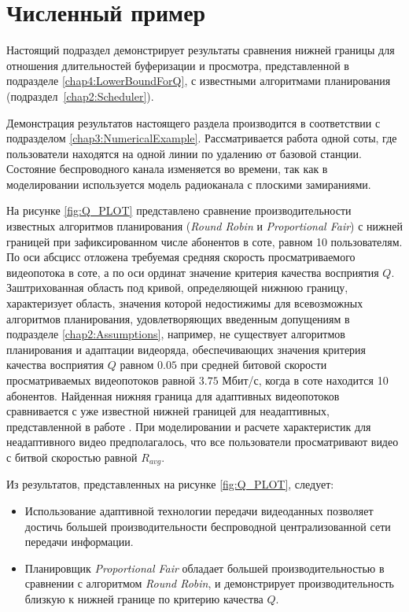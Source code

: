 \section{Численный пример}
\label{chap4:NumericalExample}

Настоящий подраздел демонстрирует результаты сравнения нижней границы для отношения длительностей буферизации и просмотра, представленной в подразделе \ref{chap4:LowerBoundForQ}, с известными алгоритмами планирования (подраздел~\ref{chap2:Scheduler}).

Демонстрация результатов настоящего раздела производится в соответствии с подразделом \ref{chap3:NumericalExample}. Рассматривается работа одной соты, где пользователи находятся на одной линии по удалению от базовой станции. Состояние беспроводного канала изменяется во времени, так как в моделировании используется модель радиоканала с плоскими замираниями.

На рисунке \ref{fig:Q_PLOT} представлено сравнение производительности известных алгоритмов планирования (\textit{Round Robin} и \textit{Proportional Fair}) с нижней границей при зафиксированном числе абонентов в соте, равном 10 пользователям. По оси абсцисс отложена требуемая средняя скорость просматриваемого видеопотока в соте, а по оси ординат значение критерия качества восприятия $Q$. Заштрихованная область под кривой, определяющей нижнюю границу, характеризует область, значения которой недостижимы для всевозможных алгоритмов планирования, удовлетворяющих введенным допущениям в подразделе \ref{chap2:Assumptions}, например, не существует алгоритмов планирования и адаптации видеоряда, обеспечивающих значения критерия качества восприятия $Q$ равном $0.05$ при средней битовой скорости просматриваемых видеопотоков равной $3.75$ Мбит/с, когда в соте находится 10 абонентов. Найденная нижняя граница для адаптивных видеопотоков сравнивается с уже известной нижней границей для неадаптивных, представленной в работе \cite{Bakin_Globecom}. При моделировании и расчете характеристик для неадаптивного видео предполагалось, что все пользователи просматривают видео с битвой скоростью равной $R_{avg}$.


Из результатов, представленных на рисунке \ref{fig:Q_PLOT}, следует:
\begin{itemize}
	\item Использование адаптивной технологии передачи видеоданных позволяет достичь большей производительности беспроводной централизованной сети передачи информации.
	\item Планировщик \textit{Proportional Fair} обладает большей производительностью в сравнении с алгоритмом \textit{Round Robin}, и демонстрирует производительность близкую к нижней границе по критерию качества $Q$.
\end{itemize}


